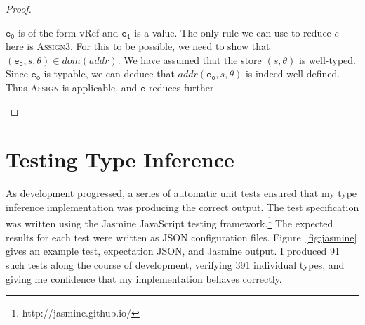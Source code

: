 \documentclass[12pt,a4paper,twoside,openright]{report}
\theoremstyle{definition}
\theoremstyle{dotless}
\newcommand{\typable}[2][ ]{\Gamma{}\vdash\mathtt{#2}\, |_C#1\:\Gamma#1'}
\newcommand{\indHyp}{\Phi(\Gamma, m, C, \Gamma')}
\begin{document}
\begin{proof}
\begin{case}[AssignType]
	\begin{subcase}
	  $\mathtt{e_0}$ is of the form vRef and $\mathtt{e_1}$ is a value.
	  The only rule we can use to reduce $e$ here is \textsc{Assign3}. For this
	  to be possible, we need to show that $(\mathtt{e_0}, s, \theta) \in dom(addr)$.
	  We have assumed that the store $(s,\theta)$ is well-typed. Since $\mathtt{e_0}$ is typable, 
	  we can deduce that $addr(\mathtt{e_0},s,\theta)$
	  is indeed well-defined. Thus \textsc{Assign} is applicable, and $\mathtt{e}$
	  reduces further.  
	\end{subcase}

  \end{case}

\end{proof}



\section{Testing Type Inference}

As development progressed, a series of automatic unit tests ensured that my
type inference implementation was producing the correct output.  The test
specification was written using the Jasmine JavaScript testing
framework.\footnote{http://jasmine.github.io/} The expected results for each
test were written as JSON configuration files. Figure~\ref{fig:jasmine} gives an example
test, expectation JSON, and Jasmine output. I produced 91 such tests along the
course of development, verifying 391 individual types, and giving me confidence
that my implementation behaves correctly.
\end{document}
